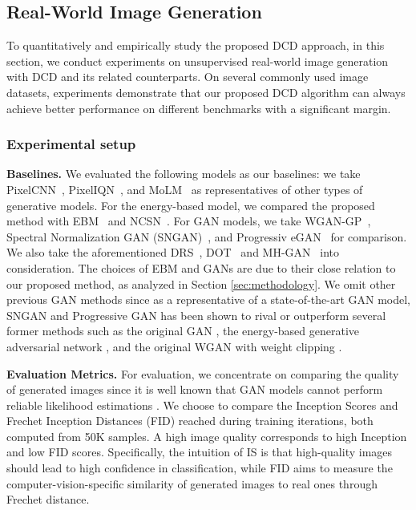 \documentclass{article}
\begin{document}
\subsection{Real-World Image Generation}

To quantitatively and empirically study the proposed DCD approach, in this section, we conduct experiments on unsupervised real-world image generation with DCD and its related counterparts. On several commonly used image datasets, experiments demonstrate that our proposed DCD algorithm can always achieve better performance on different benchmarks with a significant margin.

\subsubsection{Experimental setup}

\textbf{Baselines.} 
We evaluated the following models as our baselines: we take PixelCNN~\cite{van2016conditional}, PixelIQN~\cite{ostrovski2018autoregressive}, and MoLM~\cite{ravuri2018learning} as representatives of other types of generative models. For the energy-based model, we compared the proposed method with EBM~\cite{du2019implicit} and NCSN~\cite{song2019generative}. For GAN models, we take WGAN-GP~\cite{gulrajani2017improved}, Spectral Normalization GAN (SNGAN)~\cite{miyato2018spectral}, and Progressiv eGAN~\cite{karras2017progressive} for comparison. We also take the aforementioned DRS~\cite{azadi2018discriminator}, DOT~\cite{tanaka2019discriminator} and MH-GAN~\cite{turner2018metropolis} into consideration. The choices of EBM and GANs are due to their close relation to our proposed method, as analyzed in Section \ref{sec:methodology}. We omit other previous GAN methods since as a representative of a state-of-the-art GAN model, SNGAN and Progressive GAN has been shown to rival or outperform several former methods such as the original GAN \cite{goodfellow2014generative}, the energy-based generative adversarial network \cite{zhao2016energy}, and the original WGAN with weight clipping \cite{arjovsky2017wasserstein}.

\textbf{Evaluation Metrics.}
For evaluation, we concentrate on comparing the quality of generated images since it is well known that GAN models cannot perform reliable likelihood estimations \cite{theis2015note}. We choose to compare the Inception Scores \cite{salimans2016improved} and Frechet Inception Distances (FID) \cite{heusel2017gans} reached during training iterations, both computed from 50K samples. A high image quality corresponds to high Inception and low FID scores. 
Specifically, the intuition of IS is that high-quality images should lead to high confidence in classification, while FID aims to measure the computer-vision-specific similarity of generated images to real ones through Frechet distance.
\end{document}
